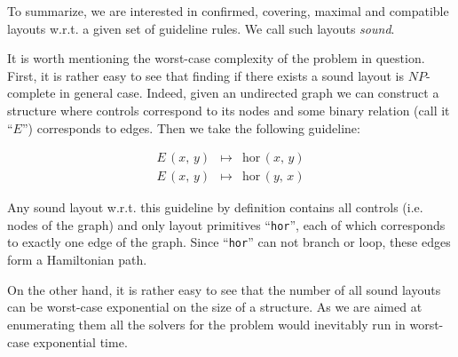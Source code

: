To summarize, we are interested in confirmed, covering, maximal and compatible layouts w.r.t. a given
set of guideline rules. We call such layouts \emph{sound}.

It is worth mentioning the worst-case complexity of the problem in question. First, it is rather
easy to see that finding if there exists a sound layout is $NP$-complete in general case.
Indeed, given an undirected graph we can construct a structure where controls correspond to its nodes
and some binary relation (call it ``$E$'') corresponds to edges. Then we take the following guideline:

\[
\begin{array}{rcl}
  E\,(x,\, y) & \mapsto & \mbox{hor}\,(x,\, y)\\
  E\,(x,\, y) & \mapsto & \mbox{hor}\,(y,\, x)
\end{array}
\]

Any sound layout w.r.t. this guideline by definition contains all controls (i.e. nodes of the graph) and
only layout primitives ``\texttt{hor}'', each of which corresponds to exactly one edge of the graph. Since
``\texttt{hor}'' can not branch or loop, these edges form a Hamiltonian path.

On the other hand, it is rather easy to see that the number of all sound layouts can be worst-case
exponential on the size of a structure. As we are aimed at enumerating them all the solvers for
the problem would inevitably run in worst-case exponential time.


